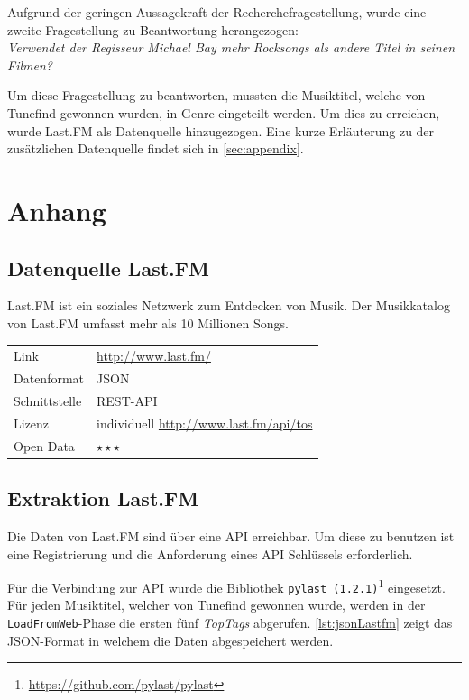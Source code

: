 \documentclass[parskip]{scrartcl}
\begin{document}
Aufgrund der geringen Aussagekraft der Recherchefragestellung, wurde eine zweite Fragestellung zu Beantwortung herangezogen:\\
\textit{Verwendet der Regisseur Michael Bay mehr Rocksongs als andere Titel in seinen Filmen?}

Um diese Fragestellung zu beantworten, mussten die Musiktitel, welche von Tunefind gewonnen wurden, in Genre eingeteilt werden. Um dies zu erreichen, wurde Last.FM als Datenquelle hinzugezogen. Eine kurze Erläuterung zu der zusätzlichen Datenquelle findet sich in \autoref{sec:appendix}.

\pagebreak
\section{Anhang}
\label{sec:appendix}

\subsection{Datenquelle Last.FM}

Last.FM ist ein soziales Netzwerk zum Entdecken von Musik. Der Musikkatalog von Last.FM umfasst mehr als 10 Millionen Songs.

\begin{tabular}{l|p{9cm}}
    Link & \url{http://www.last.fm/} \\
    Datenformat & JSON \\
    Schnittstelle & REST-API \\
    Lizenz & individuell \href{http://www.last.fm/api/tos}{http://www.last.fm/api/tos} \\
    Open Data & $\star\star\star$ \\
\end{tabular}

\subsection{Extraktion Last.FM}

Die Daten von Last.FM sind über eine API erreichbar. Um diese zu benutzen ist eine Registrierung und die Anforderung eines API Schlüssels erforderlich.

Für die Verbindung zur API wurde die Bibliothek \texttt{pylast (1.2.1)}\footnote{\href{https://github.com/pylast/pylast}{https://github.com/pylast/pylast}} eingesetzt. Für jeden Musiktitel, welcher von Tunefind gewonnen wurde, werden in der \texttt{LoadFromWeb}-Phase die ersten fünf \textit{TopTags} abgerufen. \autoref{lst:jsonLastfm} zeigt das JSON-Format in welchem die Daten abgespeichert werden.
\end{document}
